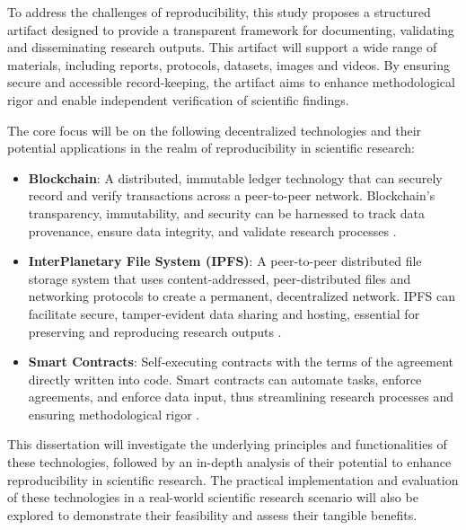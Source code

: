 To address the challenges of reproducibility, this study proposes a structured artifact designed to provide a transparent framework for documenting, validating and disseminating research outputs. This artifact will support a wide range of materials, including reports, protocols, datasets, images and videos. By ensuring secure and accessible record-keeping, the artifact aims to enhance methodological rigor and enable independent verification of scientific findings.





The core focus will be on the following decentralized technologies and their potential applications in the realm of reproducibility in scientific research:

\begin{itemize}
    \item \textbf{Blockchain}: A distributed, immutable ledger technology that can securely record and verify transactions across a peer-to-peer network. Blockchain's transparency, immutability, and security can be harnessed to track data provenance, ensure data integrity, and validate research processes \cite{christidis2016blockchain}.

    \item \textbf{InterPlanetary File System (IPFS)}: A peer-to-peer distributed file storage system that uses content-addressed, peer-distributed files and networking protocols to create a permanent, decentralized network. IPFS can facilitate secure, tamper-evident data sharing and hosting, essential for preserving and reproducing research outputs \cite{benet2014ipfs}.

    \item \textbf{Smart Contracts}: Self-executing contracts with the terms of the agreement directly written into code. Smart contracts can automate tasks, enforce agreements, and enforce data input, thus streamlining research processes and ensuring methodological rigor \cite{buterin2014ethereum}.
\end{itemize}

This dissertation will investigate the underlying principles and functionalities of these technologies, followed by an in-depth analysis of their potential to enhance reproducibility in scientific research. The practical implementation and evaluation of these technologies in a real-world scientific research scenario will also be explored to demonstrate their feasibility and assess their tangible benefits.


